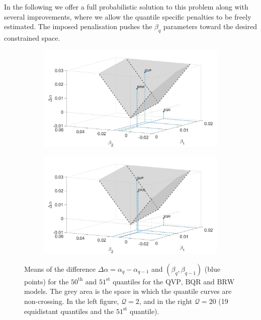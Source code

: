 In the following we offer a full probabilistic solution to this problem along with several improvements, where we allow the quantile specific penalties to be freely estimated. The imposed penalisation pushes the $\beta_q$ parameters toward the desired constrained space.
%
\begin{figure}[h]
    \centering
    \begin{subfigure}[t]{0.48\textwidth}
        \centering
        \includegraphics[width=1\textwidth]{Figures/SmallMCFig_3D_Q=2.jpg}
    \end{subfigure}%
    \hfill
    \begin{subfigure}[t]{0.48\textwidth}
        \centering
        \includegraphics[width=1\textwidth]{Figures/SmallMCFig_3D_Q=20.jpg}
    \end{subfigure}
    \caption{Means of the difference $\Delta\alpha = \alpha_{q}-\alpha_{q-1}$ and $(\beta_{q},\beta_{q-1})$ (blue points) for the $50^{\mathrm{th}}$ and $51^{\mathrm{st}}$ quantiles for the $\mathrm{QVP}$, $\mathrm{BQR}$ and $\mathrm{BRW}$ models. The grey area is the space in which the quantile curves are non-crossing. In the left figure, $\mathcal{Q}=2$, and in the right $\mathcal{Q}=20$ (19 equidistant quantiles and the $51^{\mathrm{st}}$ quantile).}
    \label{fig:nc-zone}
\end{figure}

